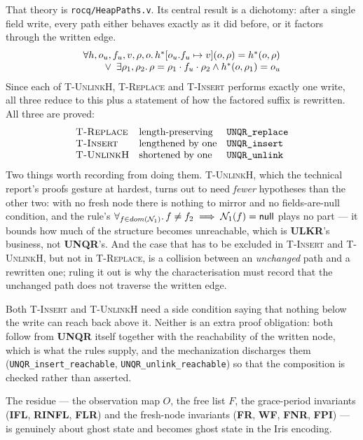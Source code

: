 That theory is \texttt{rocq/HeapPaths.v}.  Its central result is a dichotomy:
after a single field write, every path either behaves exactly as it did before,
or it factors through the written edge.
\[
\begin{array}{l}
\forall h, o_u, f_u, v, \rho, o \ldotp
  h^{*}[o_u.f_u \mapsto v](o,\rho) = h^{*}(o,\rho) \\
\qquad {} \lor\; \exists \rho_1,\rho_2 \ldotp \rho = \rho_1 \cdot f_u \cdot \rho_2
  \land h^{*}(o,\rho_1) = o_u
\end{array}
\]
Since each of \textsc{T-UnlinkH}, \textsc{T-Replace} and \textsc{T-Insert}
performs exactly one write, all three reduce to this plus a statement of how the
factored suffix is rewritten.  All three are proved:
\[
\begin{array}{lll}
\textsc{T-Replace}  & \text{length-preserving} & \texttt{UNQR\_replace} \\
\textsc{T-Insert}   & \text{lengthened by one} & \texttt{UNQR\_insert} \\
\textsc{T-UnlinkH}  & \text{shortened by one}  & \texttt{UNQR\_unlink}
\end{array}
\]
Two things worth recording from doing them.  \textsc{T-UnlinkH}, which the
technical report's proofs gesture at hardest, turns out to need \emph{fewer}
hypotheses than the other two: with no fresh node there is nothing to mirror and
no fields-are-null condition, and the rule's
$\forall_{f\in dom(\mathcal{N}_1)} \ldotp f \neq f_2 \implies \mathcal{N}_1(f) = \textsf{null}$
plays no part --- it bounds how much of the structure becomes unreachable, which
is \textbf{ULKR}'s business, not \textbf{UNQR}'s.  And the case that has to be
excluded in \textsc{T-Insert} and \textsc{T-UnlinkH}, but not in
\textsc{T-Replace}, is a collision between an \emph{unchanged} path and a
rewritten one; ruling it out is why the characterisation must record that the
unchanged path does not traverse the written edge.

Both \textsc{T-Insert} and \textsc{T-UnlinkH} need a side condition saying that
nothing below the write can reach back above it.  Neither is an extra proof
obligation: both follow from \textbf{UNQR} itself together with the reachability
of the written node, which is what the rules supply, and the mechanization
discharges them (\texttt{UNQR\_insert\_reachable},
\texttt{UNQR\_unlink\_reachable}) so that the composition is checked rather than
asserted.

The residue --- the observation map $O$, the free list $F$, the grace-period
invariants (\textbf{IFL}, \textbf{RINFL}, \textbf{FLR}) and the fresh-node
invariants (\textbf{FR}, \textbf{WF}, \textbf{FNR}, \textbf{FPI}) --- is
genuinely about ghost state and becomes ghost state in the Iris encoding.

